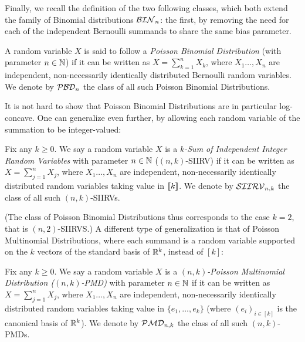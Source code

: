 Finally, we recall the definition of the two following classes, which both extend the family of Binomial distributions $\classbin[n]$: the first, by removing the need for each of the independent Bernoulli summands to share the same bias parameter.
\begin{definition}\label{def:pbd}
A random variable $X$ is said to follow a \emph{Poisson Binomial Distribution} (with parameter $n\in\N$) if it can be written as $X=\sum_{k=1}^n X_k$, where $X_1\dots,X_n$ are independent, non-necessarily identically distributed Bernoulli random variables. We denote by $\classpbd[n]$ the class of all such Poisson Binomial Distributions.
\end{definition}
\noindent It is not hard to show that Poisson Binomial Distributions are in particular log-concave. One can generalize even further, by allowing each random variable of the summation to be integer-valued:
\begin{definition}\label{def:siirv}
Fix any $k\geq 0$. We say a random variable $X$ is a \emph{$k$-Sum of Independent Integer Random Variables} with parameter $n\in\N$ ($(n,k)$-SIIRV) if it can be written as $X=\sum_{j=1}^n X_j$, where $X_1\dots,X_n$ are independent, non-necessarily identically distributed random variables taking value in $\modulo{k}$. We denote by $\classksiirv[n]{k}$ the class of all such $(n,k)$-SIIRVs.
\end{definition}
\noindent (The class of Poisson Binomial Distributions thus corresponds to the case $k=2$, that is $(n,2)$-SIIRVS.) A different type of generalization is that of Poisson Multinomial Distributions, where each summand is a random variable supported on the $k$ vectors of the standard basis of $\R^k$, instead of $[k]$:
\begin{definition}\label{def:pmd}
Fix any $k\geq 0$. We say a random variable $X$ is a \emph{$(n,k)$-Poisson Multinomial Distribution ($(n,k)$-PMD)} with parameter $n\in\N$ if it can be written as $X=\sum_{j=1}^n X_j$, where $X_1\dots,X_n$ are independent, non-necessarily identically distributed random variables taking value in $\{e_1,\dots,e_k\}$ (where $(e_i)_{i\in[k]}$ is the canonical basis of $\R^k$). We denote by $\classpmd[n]{k}$ the class of all such $(n,k)$-PMDs.
\end{definition}

